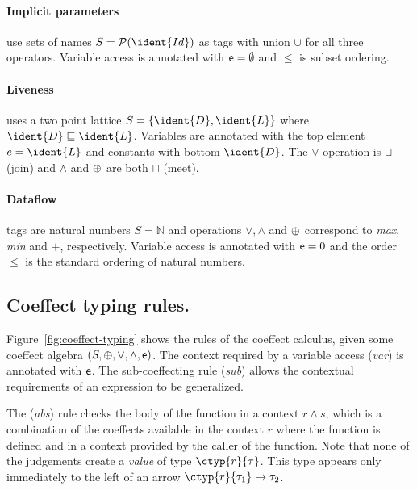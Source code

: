 \vspace{-0.4em}
\paragraph{Implicit parameters} use sets of names $S = \mathcal{P}(\ident{Id})$ as tags with
union $\cup$ for all three operators. Variable access is annotated with $\mathsf{e} = \emptyset$
and $\leq$ is subset ordering.

\vspace{-0.4em}
\paragraph{Liveness} uses a two point lattice $S=\{ \ident{D}, \ident{L} \}$ where
$\ident{D} \sqsubseteq \ident{L}$. Variables are annotated with the top element $e = \ident{L}$ 
and constants with bottom $\ident{D}$. The $\vee$ operation is $\sqcup$ (join) and $\wedge$
and $\oplus$ are both $\sqcap$ (meet).

\vspace{-0.4em}
\paragraph{Dataflow} tags are natural numbers $S = \mathbb{N}$ and operations
$\vee, \wedge$ and $\oplus$ correspond to \textit{max}, \textit{min} and $+$, respectively. 
Variable access is annotated with $\mathsf{e} = 0$ and the order $\leq$ is the standard ordering
of natural numbers.


\vspace{-1em}
\subsection{Coeffect typing rules.}
Figure~\ref{fig:coeffect-typing} shows the
rules of the coeffect calculus, given some coeffect algebra $(S, \oplus, \vee, \wedge, \mathsf{e})$.
The context required by a variable access (\emph{var}) is annotated with $\mathsf{e}$.
The sub-coeffecting rule (\emph{sub}) allows the contextual requirements of an expression 
to be generalized.

The (\emph{abs}) rule checks the body of the function in a context $r \wedge s$, which is a 
combination of the coeffects available in the context $r$ where the function is 
defined and in a context provided by the caller of the function. 
Note that none of the judgements create a \emph{value} of type $\ctyp{r}{\tau}$. This
type appears only immediately to the left of  an arrow $\ctyp{r}{\tau_1} \rightarrow \tau_2$.

